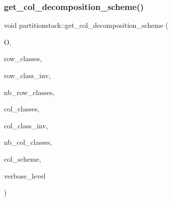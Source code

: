 \mbox{\label{classpartitionstack_a43e2bcd2edd73c3598110ab5517e1373}} 
\subsubsection{\texorpdfstring{get\+\_\+col\+\_\+decomposition\+\_\+scheme()}{get\_col\_decomposition\_scheme()}}
{\footnotesize\ttfamily void partitionstack\+::get\+\_\+col\+\_\+decomposition\+\_\+scheme (\begin{DoxyParamCaption}\item[{\mbox{\hyperlink{classorthogonal}{orthogonal}} \&}]{O,  }\item[{\mbox{\hyperlink{galois_8h_a09fddde158a3a20bd2dcadb609de11dc}{I\+NT}} $\ast$}]{row\+\_\+classes,  }\item[{\mbox{\hyperlink{galois_8h_a09fddde158a3a20bd2dcadb609de11dc}{I\+NT}} $\ast$}]{row\+\_\+class\+\_\+inv,  }\item[{\mbox{\hyperlink{galois_8h_a09fddde158a3a20bd2dcadb609de11dc}{I\+NT}}}]{nb\+\_\+row\+\_\+classes,  }\item[{\mbox{\hyperlink{galois_8h_a09fddde158a3a20bd2dcadb609de11dc}{I\+NT}} $\ast$}]{col\+\_\+classes,  }\item[{\mbox{\hyperlink{galois_8h_a09fddde158a3a20bd2dcadb609de11dc}{I\+NT}} $\ast$}]{col\+\_\+class\+\_\+inv,  }\item[{\mbox{\hyperlink{galois_8h_a09fddde158a3a20bd2dcadb609de11dc}{I\+NT}}}]{nb\+\_\+col\+\_\+classes,  }\item[{\mbox{\hyperlink{galois_8h_a09fddde158a3a20bd2dcadb609de11dc}{I\+NT}} $\ast$}]{col\+\_\+scheme,  }\item[{\mbox{\hyperlink{galois_8h_a09fddde158a3a20bd2dcadb609de11dc}{I\+NT}}}]{verbose\+\_\+level }\end{DoxyParamCaption})}

\mbox{\label{classpartitionstack_a127a6965905c3f08c50ee09a100cb465}} 

